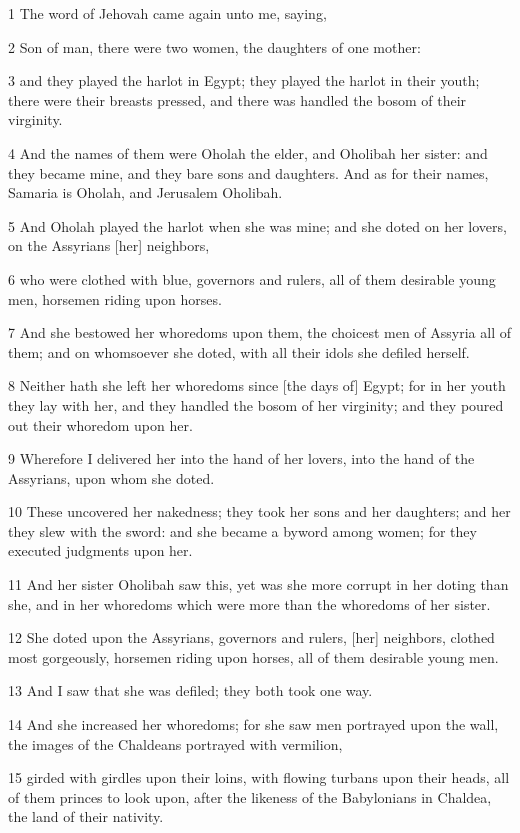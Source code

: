 \par 1 The word of Jehovah came again unto me, saying,
\par 2 Son of man, there were two women, the daughters of one mother:
\par 3 and they played the harlot in Egypt; they played the harlot in their youth; there were their breasts pressed, and there was handled the bosom of their virginity.
\par 4 And the names of them were Oholah the elder, and Oholibah her sister: and they became mine, and they bare sons and daughters. And as for their names, Samaria is Oholah, and Jerusalem Oholibah.
\par 5 And Oholah played the harlot when she was mine; and she doted on her lovers, on the Assyrians [her] neighbors,
\par 6 who were clothed with blue, governors and rulers, all of them desirable young men, horsemen riding upon horses.
\par 7 And she bestowed her whoredoms upon them, the choicest men of Assyria all of them; and on whomsoever she doted, with all their idols she defiled herself.
\par 8 Neither hath she left her whoredoms since [the days of] Egypt; for in her youth they lay with her, and they handled the bosom of her virginity; and they poured out their whoredom upon her.
\par 9 Wherefore I delivered her into the hand of her lovers, into the hand of the Assyrians, upon whom she doted.
\par 10 These uncovered her nakedness; they took her sons and her daughters; and her they slew with the sword: and she became a byword among women; for they executed judgments upon her.
\par 11 And her sister Oholibah saw this, yet was she more corrupt in her doting than she, and in her whoredoms which were more than the whoredoms of her sister.
\par 12 She doted upon the Assyrians, governors and rulers, [her] neighbors, clothed most gorgeously, horsemen riding upon horses, all of them desirable young men.
\par 13 And I saw that she was defiled; they both took one way.
\par 14 And she increased her whoredoms; for she saw men portrayed upon the wall, the images of the Chaldeans portrayed with vermilion,
\par 15 girded with girdles upon their loins, with flowing turbans upon their heads, all of them princes to look upon, after the likeness of the Babylonians in Chaldea, the land of their nativity.
